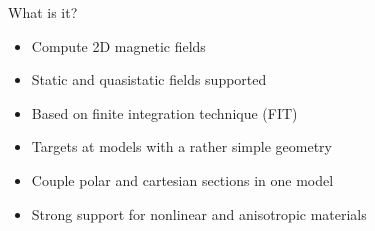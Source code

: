 %
%
%
%
%

\begin{frame}{What is it?}
  \begin{itemize}
  \item Compute 2D magnetic fields
  \item Static and quasistatic fields supported
  \item Based on finite integration technique (FIT)
  \item Targets at models with a rather simple geometry
  \item Couple polar and cartesian sections in one model
  \item Strong support for nonlinear and anisotropic materials
  \end{itemize}
  \vfill
  \centering
\end{frame}


